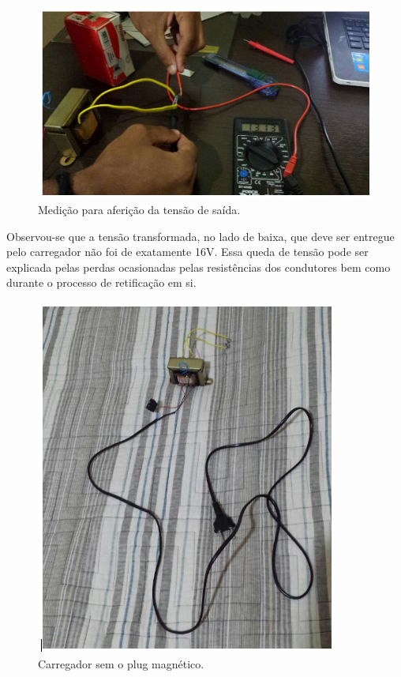  \begin{figure}[H]
	\centering
	\includegraphics[scale=0.5]{figuras/medicaoafericaotensao}
	\caption{Medição para aferição da tensão de saída.}
	\label{img:medicaoafericaotensao}
\end{figure}

Observou-se que a tensão transformada, no lado de baixa, que deve ser entregue pelo carregador não foi de exatamente 16V. Essa queda de tensão pode ser explicada pelas perdas ocasionadas pelas resistências dos condutores bem como durante o processo de retificação em si.

 \begin{figure}[H]
	\centering
	\includegraphics[scale=0.5]{figuras/carregadorsemplugmag}
	\caption{Carregador sem o plug magnético.}
	\label{img:carregadorsemplugmag}
\end{figure}

